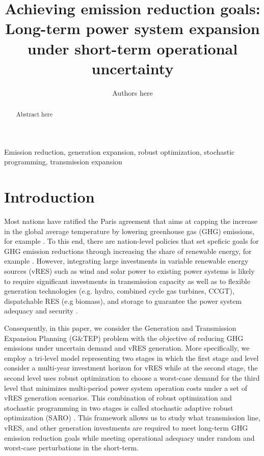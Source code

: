 \documentclass[final]{IEEEtran}
\begin{document}
\title{Achieving emission reduction goals: Long-term power system expansion under short-term operational uncertainty}
\author{Authors here}
\maketitle

\begin{abstract}
Abstract here
\end{abstract}
\begin{IEEEkeywords}
Emission reduction, generation expansion, robust optimization, stochastic programming, transmission expansion
\end{IEEEkeywords}

\section{Introduction}

Most nations have ratified the Paris agreement that aims at capping the increase in the global average temperature by lowering greenhouse gas (GHG) emissions, for example \cite{Paris_agreement}. To this end, there are nation-level policies that set speficic goals for GHG emission reductions through increasing the share of renewable energy, for example \cite{EU_climate_action}. However, integrating large investments in variable renewable energy sources (vRES) such as wind and solar power to existing power systems is likely to require significant investments in transmission capacity as well as to flexible generation technologies (e.g. hydro, combined cycle gas turbines, CCGT), dispatchable RES (e.g biomass), and storage to guarantee the power system adequacy and security \cite{Zappa}.

Consequently, in this paper, we consider the Generation and Transmission Expansion Planning (G\&TEP) problem with the objective of reducing GHG emissions under uncertain demand and vRES generation. More specifically, we employ a tri-level model representing two stages in which the first stage and level consider a multi-year investment horizon for vRES while at the second stage, the second level uses robust optimization to choose a worst-case demand for the third level that minimizes multi-period power system operation costs under a set of vRES generation scenarios. This combination of robust optimization and stochastic programming in two stages is called stochastic adaptive robust optimization (SARO) \cite{Baringo2018}. This framework allows us to study what transmission line, vRES, and other generation investments are required to meet long-term GHG emission reduction goals while meeting operational adequacy under random and worst-case perturbations in the short-term.
\end{document}
